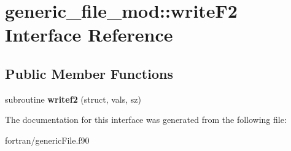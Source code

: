 \hypertarget{interfacegeneric__file__mod_1_1write_f2}{}\section{generic\+\_\+file\+\_\+mod\+:\+:write\+F2 Interface Reference}
\label{interfacegeneric__file__mod_1_1write_f2}
\subsection*{Public Member Functions}
\begin{DoxyCompactItemize}
\item 
\mbox{\label{interfacegeneric__file__mod_1_1write_f2_af5a61aa5a6506154782c5e38ae51420d}} 
subroutine {\bfseries writef2} (struct, vals, sz)
\end{DoxyCompactItemize}


The documentation for this interface was generated from the following file\+:\begin{DoxyCompactItemize}
\item 
fortran/generic\+File.\+f90\end{DoxyCompactItemize}
